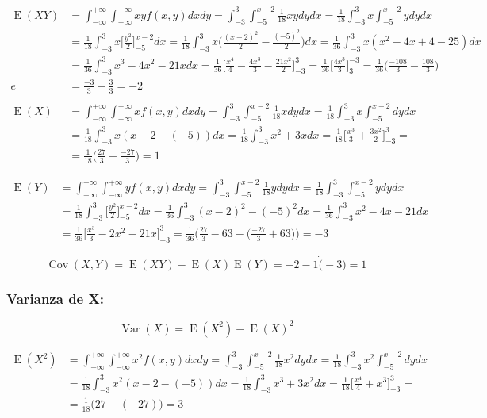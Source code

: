 \documentclass[tikz]{article}
\DeclareMathOperator{\Var}{Var}
\DeclareMathOperator{\Cov}{Cov}
\DeclareMathOperator{\E}{E}
\begin{document}
\begin{align*}
  \E(XY)&=\int_{-\infty}^{+\infty}\int_{-\infty}^{+\infty}xyf(x,y)dxdy=\int_{-3}^3\int_{-5}^{x-2}\frac{1}{18}xydydx=\frac{1}{18}\int_{-3}^3x\int_{-5}^{x-2}ydydx \\
               &=\frac{1}{18}\int_{-3}^3x\bigg[\frac{y^2}{2}\bigg]_{-5}^{x-2}dx=\frac{1}{18}\int_{-3}^3x\bigg(\frac{(x-2)^2}{2}-\frac{(-5)^2}{2}\bigg)dx=\frac{1}{36}\int_{-3}^3x(x^2-4x+4-25)dx \\
               &=\frac{1}{36}\int_{-3}^3x^3-4x^2-21xdx=\frac{1}{36}\bigg[\frac{x^4}{4}-\frac{4x^3}{3}-\frac{21x^2}{2}\bigg]_{-3}^3=\frac{1}{36}\bigg[\frac{4x^3}{3}\bigg]_3^{-3}=\frac{1}{36}\bigg(\frac{-108}{3}-\frac{108}{3}\bigg) \\
e               &=\frac{-3}{3}-\frac{3}{3}=-2 \\
  ~\\
  \E(X)&=\int_{-\infty}^{+\infty}\int_{-\infty}^{+\infty}xf(x,y)dxdy=\int_{-3}^3\int_{-5}^{x-2}\frac{1}{18}xdydx=\frac{1}{18}\int_{-3}^3x\int_{-5}^{x-2}dydx \\
               &=\frac{1}{18}\int_{-3}^3x(x-2-(-5))dx=\frac{1}{18}\int_{-3}^{3}x^2+3xdx=\frac{1}{18}\bigg[\frac{x^3}{3}+\frac{3x^2}{2}\bigg]_{-3}^3= \\
               &=\frac{1}{18}\bigg(\frac{27}{3}-\frac{-27}{3}\bigg)=1
\end{align*}

\begin{align*}
  \E(Y)&=\int_{-\infty}^{+\infty}\int_{-\infty}^{+\infty}yf(x,y)dxdy=\int_{-3}^3\int_{-5}^{x-2}\frac{1}{18}ydydx=\frac{1}{18}\int_{-3}^3\int_{-5}^{x-2}ydydx \\
              &=\frac{1}{18}\int_{-3}^3\bigg[\frac{y^2}{2}\bigg]_{-5}^{x-2}dx=\frac{1}{36}\int_{-3}^{3}(x-2)^2-(-5)^2dx=\frac{1}{36}\int_{-3}^{3}x^2-4x-21dx \\ &=\frac{1}{36}\bigg[\frac{x^3}{3}-2x^2-21x\bigg]_{-3}^3=\frac{1}{36}\bigg(\frac{27}{3}-63-\Big(\frac{-27}{3}+63\Big)\bigg)=-3
\end{align*}

\[\Cov(X,Y)=\E(XY)-\E(X)\E(Y)=-2-1\dot(-3)=1\]

\subsubsection*{Varianza de X:}

\[\Var(X)=\E(X^2)-\E(X)^2\]

\begin{align*}
  \E(X^2)&=\int_{-\infty}^{+\infty}\int_{-\infty}^{+\infty}x^2f(x,y)dxdy=\int_{-3}^3\int_{-5}^{x-2}\frac{1}{18}x^2dydx=\frac{1}{18}\int_{-3}^3x^2\int_{-5}^{x-2}dydx \\
                &=\frac{1}{18}\int_{-3}^3x^2(x-2-(-5))dx=\frac{1}{18}\int_{-3}^{3}x^3+3x^2dx=\frac{1}{18}\bigg[\frac{x^4}{4}+x^3\bigg]_{-3}^3= \\
                &=\frac{1}{18}\Big(27-(-27)\Big)=3
\end{align*}
\end{document}

